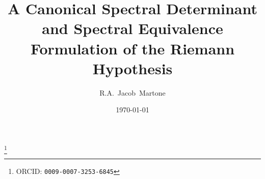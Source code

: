 
\title[A Spectral Determinant for the Riemann Hypothesis]%
  {A Canonical Spectral Determinant and Spectral Equivalence Formulation of the Riemann Hypothesis}



\author[R.A.~Jacob~Martone]{R.A.~Jacob~Martone}
\address{Radio Park, Fresno, California, USA}

\thanks{ORCID: \texttt{0009-0007-3253-6845}}


\date{\today}